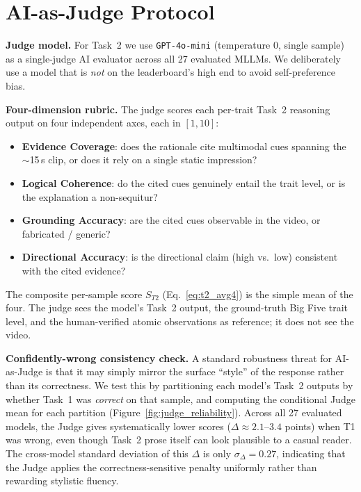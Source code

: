 \documentclass{llmxive}
\begin{document}
\section{AI-as-Judge Protocol}
\label{app:judge}

\noindent\textbf{Judge model.} For Task~2 we use \texttt{GPT-4o-mini} (temperature $0$, single sample) as a single-judge AI evaluator across all 27 evaluated MLLMs. We deliberately use a model that is \emph{not} on the leaderboard's high end to avoid self-preference bias.

\noindent\textbf{Four-dimension rubric.} The judge scores each per-trait Task~2 reasoning output on four independent axes, each in $[1, 10]$:

\begin{itemize}[leftmargin=1.3em, itemsep=1pt, topsep=2pt]
\item \textbf{Evidence Coverage}: does the rationale cite multimodal cues spanning the $\sim$15\,s clip, or does it rely on a single static impression?
\item \textbf{Logical Coherence}: do the cited cues genuinely entail the trait level, or is the explanation a non-sequitur?
\item \textbf{Grounding Accuracy}: are the cited cues observable in the video, or fabricated / generic?
\item \textbf{Directional Accuracy}: is the directional claim (high vs.\ low) consistent with the cited evidence?
\end{itemize}

The composite per-sample score $S_{T2}$ (Eq.~\ref{eq:t2_avg4}) is the simple mean of the four. The judge sees the model's Task~2 output, the ground-truth Big Five trait level, and the human-verified atomic observations as reference; it does not see the video.

\noindent\textbf{Confidently-wrong consistency check.} A standard robustness threat for AI-as-Judge is that it may simply mirror the surface ``style'' of the response rather than its correctness. We test this by partitioning each model's Task~2 outputs by whether Task~1 was \emph{correct} on that sample, and computing the conditional Judge mean for each partition (Figure~\ref{fig:judge_reliability}). Across all 27 evaluated models, the Judge gives systematically lower scores ($\Delta\!\approx\!2.1$--$3.4$ points) when T1 was wrong, even though Task~2 prose itself can look plausible to a casual reader. The cross-model standard deviation of this $\Delta$ is only $\sigma_\Delta\!=\!0.27$, indicating that the Judge applies the correctness-sensitive penalty uniformly rather than rewarding stylistic fluency.
\end{document}
